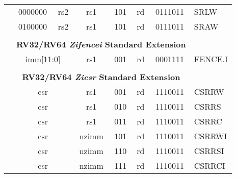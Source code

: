 \begin{table}[p]
\begin{small}
\begin{center}
\begin{tabular}{p{0in}p{0.4in}p{0.05in}p{0.05in}p{0.05in}p{0.05in}p{0.4in}p{0.6in}p{0.4in}p{0.6in}p{0.7in}l}
&
\multicolumn{4}{|c|}{0000000} &
\multicolumn{2}{c|}{rs2} &
\multicolumn{1}{c|}{rs1} &
\multicolumn{1}{c|}{101} &
\multicolumn{1}{c|}{rd} &
\multicolumn{1}{c|}{0111011} & SRLW \\
\cline{2-11}
  

&
\multicolumn{4}{|c|}{0100000} &
\multicolumn{2}{c|}{rs2} &
\multicolumn{1}{c|}{rs1} &
\multicolumn{1}{c|}{101} &
\multicolumn{1}{c|}{rd} &
\multicolumn{1}{c|}{0111011} & SRAW \\
\cline{2-11}
  

&
\multicolumn{10}{c}{} & \\
&
\multicolumn{10}{c}{\bf RV32/RV64 \emph{Zifencei} Standard Extension} & \\
\cline{2-11}
  

&
\multicolumn{6}{|c|}{imm[11:0]} &
\multicolumn{1}{c|}{rs1} &
\multicolumn{1}{c|}{001} &
\multicolumn{1}{c|}{rd} &
\multicolumn{1}{c|}{0001111} & FENCE.I \\
\cline{2-11}
  

&
\multicolumn{10}{c}{} & \\
&
\multicolumn{10}{c}{\bf RV32/RV64 \emph{Zicsr} Standard Extension} & \\
\cline{2-11}
  

&
\multicolumn{6}{|c|}{csr} &
\multicolumn{1}{c|}{rs1} &
\multicolumn{1}{c|}{001} &
\multicolumn{1}{c|}{rd} &
\multicolumn{1}{c|}{1110011} & CSRRW \\
\cline{2-11}
  

&
\multicolumn{6}{|c|}{csr} &
\multicolumn{1}{c|}{rs1} &
\multicolumn{1}{c|}{010} &
\multicolumn{1}{c|}{rd} &
\multicolumn{1}{c|}{1110011} & CSRRS \\
\cline{2-11}
  

&
\multicolumn{6}{|c|}{csr} &
\multicolumn{1}{c|}{rs1} &
\multicolumn{1}{c|}{011} &
\multicolumn{1}{c|}{rd} &
\multicolumn{1}{c|}{1110011} & CSRRC \\
\cline{2-11}
  

&
\multicolumn{6}{|c|}{csr} &
\multicolumn{1}{c|}{nzimm} &
\multicolumn{1}{c|}{101} &
\multicolumn{1}{c|}{rd} &
\multicolumn{1}{c|}{1110011} & CSRRWI \\
\cline{2-11}
  

&
\multicolumn{6}{|c|}{csr} &
\multicolumn{1}{c|}{nzimm} &
\multicolumn{1}{c|}{110} &
\multicolumn{1}{c|}{rd} &
\multicolumn{1}{c|}{1110011} & CSRRSI \\
\cline{2-11}
  

&
\multicolumn{6}{|c|}{csr} &
\multicolumn{1}{c|}{nzimm} &
\multicolumn{1}{c|}{111} &
\multicolumn{1}{c|}{rd} &
\multicolumn{1}{c|}{1110011} & CSRRCI \\
\cline{2-11}
  


\end{tabular}
\end{center}
\end{small}
\end{table}
